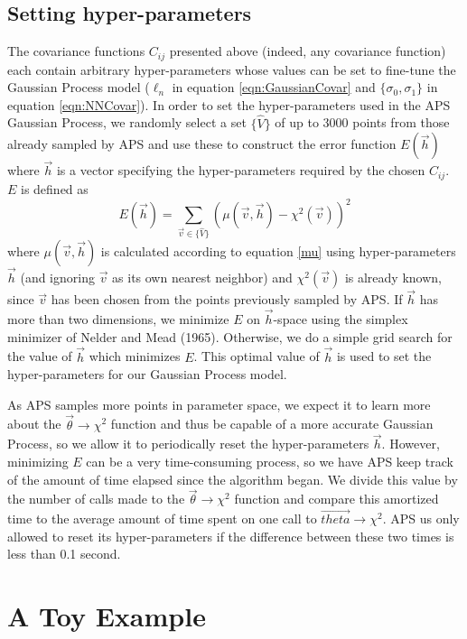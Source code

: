 \documentclass[useAMS,usenatbib]{aastex}
\begin{document}
\subsection{Setting hyper-parameters}
\label{sec:hyperparams}

The covariance functions $C_{ij}$ presented above (indeed, any covariance function)
each contain arbitrary hyper-parameters whose values can be set to fine-tune
the Gaussian Process model ($\ell_n$ in equation \ref{eqn:GaussianCovar}
and $\{\sigma_0,\sigma_1\}$ in equation \ref{eqn:NNCovar}).  
In order to set the hyper-parameters used in the APS Gaussian Process, we randomly
select a set $\{\hat{V}\}$ of up to 3000 points from those already sampled by APS 
and use these to construct
the error function $E(\vec{h})$ where $\vec{h}$ is a vector specifying the hyper-parameters
required by the chosen $C_{ij}$.  $E$ is defined as
\begin{equation}
\label{eqn:hyperparamError}
E(\vec{h})=\sum_{\vec{v}\in\{\hat{V}\}}\left(\mu(\vec{v},\vec{h})-\chi^2(\vec{v})\right)^2
\end{equation}
where $\mu(\vec{v},\vec{h})$ is calculated according to equation \ref{mu} using
hyper-parameters $\vec{h}$ (and ignoring $\vec{v}$ as its own nearest neighbor) and
$\chi^2(\vec{v})$ is already known, since $\vec{v}$ has been chosen from the points previously
sampled by APS.  If $\vec{h}$ has more than two dimensions, we minimize $E$ on $\vec{h}$-space
using the simplex
minimizer of Nelder and Mead (1965).  Otherwise, we do a simple grid search for the value of
$\vec{h}$ which minimizes $E$.  This optimal value of $\vec{h}$ is used to set
the hyper-parameters for our Gaussian Process model.

As APS samples more points in parameter space, we expect it to learn more about the
$\vec{\theta}\rightarrow\chi^2$ function and thus be capable of a more accurate Gaussian
Process, so we allow it to periodically reset the hyper-parameters $\vec{h}$.  However,
minimizing $E$ can be a very time-consuming process, so we have APS keep track of the amount of
time elapsed since the algorithm began.  We divide this value by the number of calls made to
the $\vec{\theta}\rightarrow\chi^2$ function and compare this amortized time to the average
amount of time spent on one call to $\vec{theta}\rightarrow\chi^2$.  APS us only allowed to
reset its hyper-parameters if the difference between these two times is less than 0.1 second.

\section{A Toy Example}
\label{sec:toy}
\end{document}
